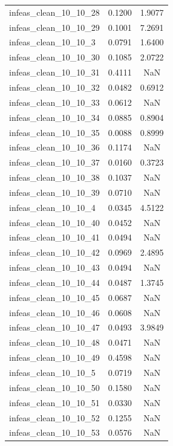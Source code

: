 \begin{longtable}{lcc}
infeas\_clean\_10\_10\_28  &   0.1200 &  1.9077 \\
infeas\_clean\_10\_10\_29  &   0.1001 &  7.2691 \\
infeas\_clean\_10\_10\_3   &   0.0791 &  1.6400 \\
infeas\_clean\_10\_10\_30  &   0.1085 &  2.0722 \\
infeas\_clean\_10\_10\_31  &   0.4111 &     NaN \\
infeas\_clean\_10\_10\_32  &   0.0482 &  0.6912 \\
infeas\_clean\_10\_10\_33  &   0.0612 &     NaN \\
infeas\_clean\_10\_10\_34  &   0.0885 &  0.8904 \\
infeas\_clean\_10\_10\_35  &   0.0088 &  0.8999 \\
infeas\_clean\_10\_10\_36  &   0.1174 &     NaN \\
infeas\_clean\_10\_10\_37  &   0.0160 &  0.3723 \\
infeas\_clean\_10\_10\_38  &   0.1037 &     NaN \\
infeas\_clean\_10\_10\_39  &   0.0710 &     NaN \\
infeas\_clean\_10\_10\_4   &   0.0345 &  4.5122 \\
infeas\_clean\_10\_10\_40  &   0.0452 &     NaN \\
infeas\_clean\_10\_10\_41  &   0.0494 &     NaN \\
infeas\_clean\_10\_10\_42  &   0.0969 &  2.4895 \\
infeas\_clean\_10\_10\_43  &   0.0494 &     NaN \\
infeas\_clean\_10\_10\_44  &   0.0487 &  1.3745 \\
infeas\_clean\_10\_10\_45  &   0.0687 &     NaN \\
infeas\_clean\_10\_10\_46  &   0.0608 &     NaN \\
infeas\_clean\_10\_10\_47  &   0.0493 &  3.9849 \\
infeas\_clean\_10\_10\_48  &   0.0471 &     NaN \\
infeas\_clean\_10\_10\_49  &   0.4598 &     NaN \\
infeas\_clean\_10\_10\_5   &   0.0719 &     NaN \\
infeas\_clean\_10\_10\_50  &   0.1580 &     NaN \\
infeas\_clean\_10\_10\_51  &   0.0330 &     NaN \\
infeas\_clean\_10\_10\_52  &   0.1255 &     NaN \\
infeas\_clean\_10\_10\_53  &   0.0576 &     NaN \\

\end{longtable}
